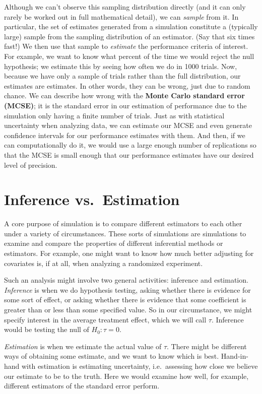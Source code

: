 \documentclass[
]{book}
\begin{document}
Although we can't observe this sampling distribution directly (and it can only rarely be worked out in full mathematical detail), we can \emph{sample} from it.
In particular, the set of estimates generated from a simulation constitute a (typically large) sample from the sampling distribution of an estimator. (Say that six times fast!)
We then use that sample to \emph{estimate} the performance criteria of interest.
For example, we want to know what percent of the time we would reject the null hypothesis; we estimate this by seeing how often we do in 1000 trials.
Now, because we have only a sample of trials rather than the full distribution, our estimates are estimates.
In other words, they can be wrong, just due to random chance.
We can describe how wrong with the \textbf{Monte Carlo standard error (MCSE)}; it is the standard error in our estimation of performance due to the simulation only having a finite number of trials.
Just as with statistical uncertainty when analyzing data, we can estimate our MCSE and even generate confidence intervals for our performance estimates with them.
And then, if we can computationally do it, we would use a large enough number of replications so that the MCSE is small enough that our performance estimates have our desired level of precision.

\hypertarget{inference-vs.-estimation}{%
\section{Inference vs.~Estimation}\label{inference-vs.-estimation}}

A core purpose of simulation is to compare different estimators to each other under a variety of circumstances.
These sorts of simulations are simulations to examine and compare the properties of different inferential methods or estimators.
For example, one might want to know how much better adjusting for covariates is, if at all, when analyzing a randomized experiment.

Such an analysis might involve two general activities: inference and estimation.
\emph{Inference} is when we do hypothesis testing, asking whether there is evidence for some sort of effect, or asking whether there is evidence that some coefficient is greater than or less than some specified value.
So in our circumstance, we might specify interest in the average treatment effect, which we will call \(\tau\).
Inference would be testing the null of \(H_0: \tau = 0\).

\emph{Estimation} is when we estimate the actual value of \(\tau\).
There might be different ways of obtaining some estimate, and we want to know which is best.
Hand-in-hand with estimation is estimating uncertainty, i.e.~assessing how close we believe our estimate to be to the truth.
Here we would examine how well, for example, different estimators of the standard error perform.
\end{document}
